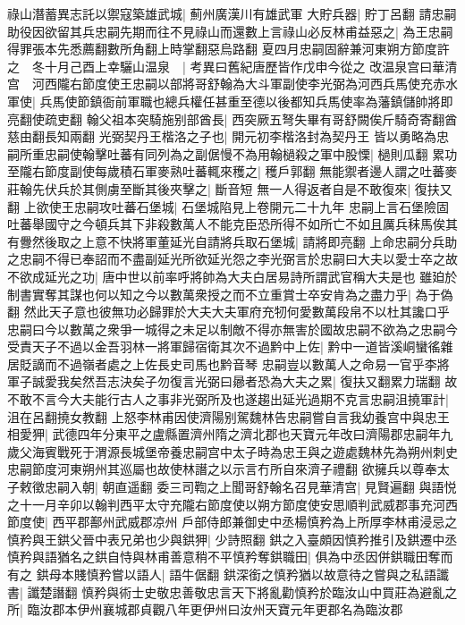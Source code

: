 祿山潛蓄異志託以禦寇築雄武城|{
	薊州廣漢川有雄武軍}
大貯兵器|{
	貯丁呂翻}
請忠嗣助役因欲留其兵忠嗣先期而往不見祿山而還數上言祿山必反林甫益惡之|{
	為王忠嗣得罪張本先悉薦翻數所角翻上時掌翻惡烏路翻}
夏四月忠嗣固辭兼河東朔方節度許之　冬十月己酉上幸驪山温泉　|{
	考異曰舊紀唐歷皆作戊申今從之}
改温泉宫曰華清宫　河西隴右節度使王忠嗣以部將哥舒翰為大斗軍副使李光弼為河西兵馬使充赤水軍使|{
	兵馬使節鎮衙前軍職也總兵權任甚重至德以後都知兵馬使率為藩鎮儲帥將即亮翻使疏吏翻}
翰父祖本突騎施别部酋長|{
	西突厥五弩失畢有哥舒闕俟斤騎奇寄翻酋慈由翻長知兩翻}
光弼契丹王楷洛之子也|{
	開元初李楷洛封為契丹王}
皆以勇略為忠嗣所重忠嗣使翰擊吐蕃有同列為之副倨慢不為用翰檛殺之軍中股慄|{
	檛則瓜翻}
累功至隴右節度副使每歲積石軍麥熟吐蕃輒來穫之|{
	穫戶郭翻}
無能禦者邊人謂之吐蕃麥莊翰先伏兵於其側虜至斷其後夾擊之|{
	斷音短}
無一人得返者自是不敢復來|{
	復扶又翻}
上欲使王忠嗣攻吐蕃石堡城|{
	石堡城陷見上卷開元二十九年}
忠嗣上言石堡險固吐蕃舉國守之今頓兵其下非殺數萬人不能克臣恐所得不如所亡不如且厲兵秣馬俟其有釁然後取之上意不快將軍董延光自請將兵取石堡城|{
	請將即亮翻}
上命忠嗣分兵助之忠嗣不得已奉詔而不盡副延光所欲延光怨之李光弼言於忠嗣曰大夫以愛士卒之故不欲成延光之功|{
	唐中世以前率呼將帥為大夫白居易詩所謂武官稱大夫是也}
雖廹於制書實奪其謀也何以知之今以數萬衆授之而不立重賞士卒安肯為之盡力乎|{
	為于偽翻}
然此天子意也彼無功必歸罪於大夫大夫軍府充牣何愛數萬段帛不以杜其讒口乎忠嗣曰今以數萬之衆爭一城得之未足以制敵不得亦無害於國故忠嗣不欲為之忠嗣今受責天子不過以金吾羽林一將軍歸宿衛其次不過黔中上佐|{
	黔中一道皆溪峒蠻徭雜居貶謫而不過嶺者處之上佐長史司馬也黔音琴}
忠嗣豈以數萬人之命易一官乎李將軍子誠愛我矣然吾志決矣子勿復言光弼曰曏者恐為大夫之累|{
	復扶又翻累力瑞翻}
故不敢不言今大夫能行古人之事非光弼所及也遂趨出延光過期不克言忠嗣沮撓軍計|{
	沮在呂翻撓女教翻}
上怒李林甫因使濟陽别駕魏林告忠嗣嘗自言我幼養宫中與忠王相愛狎|{
	武德四年分東平之盧縣置濟州隋之濟北郡也天寶元年改曰濟陽郡忠嗣年九歲父海賓戰死于渭源長城堡帝養忠嗣宫中太子時為忠王與之遊處魏林先為朔州刺史忠嗣節度河東朔州其巡屬也故使林譖之以示言冇所自來濟子禮翻}
欲擁兵以尊奉太子敕徵忠嗣入朝|{
	朝直遥翻}
委三司鞫之上聞哥舒翰名召見華清宫|{
	見賢遍翻}
與語悦之十一月辛卯以翰判西平太守充隴右節度使以朔方節度使安思順判武威郡事充河西節度使|{
	西平郡鄯州武威郡凉州}
戶部侍郎兼御史中丞楊慎矜為上所厚李林甫浸忌之慎矜與王鉷父晉中表兄弟也少與鉷狎|{
	少詩照翻}
鉷之入臺頗因慎矜推引及鉷遷中丞慎矜與語猶名之鉷自恃與林甫善意稍不平慎矜奪鉷職田|{
	俱為中丞因併鉷職田奪而有之}
鉷母本賤慎矜嘗以語人|{
	語牛倨翻}
鉷深銜之慎矜猶以故意待之嘗與之私語讖書|{
	讖楚譖翻}
慎矜與術士史敬忠善敬忠言天下將亂勸慎矜於臨汝山中買莊為避亂之所|{
	臨汝郡本伊州襄城郡貞觀八年更伊州曰汝州天寶元年更郡名為臨汝郡}
